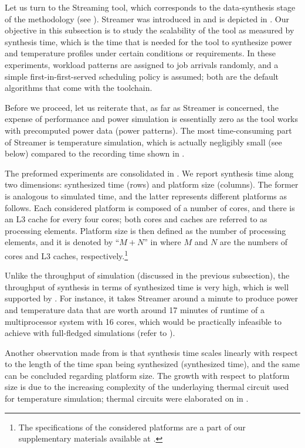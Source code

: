 
Let us turn to the Streaming tool, which corresponds to the data-synthesis stage
of the methodology (see ). Streamer was introduced in
 and is depicted in . Our objective in this
subsection is to study the scalability of the tool as measured by synthesis
time, which is the time that is needed for the tool to synthesize power and
temperature profiles under certain conditions or requirements. In these
experiments, workload patterns are assigned to job arrivals randomly, and a
simple first-in-first-served scheduling policy is assumed; both are the default
algorithms that come with the toolchain.

Before we proceed, let us reiterate that, as far as Streamer is concerned, the
expense of performance and power simulation is essentially zero as the tool
works with precomputed power data (power patterns). The most time-consuming part
of Streamer is temperature simulation, which is actually negligibly small (see
below) compared to the recording time shown in .

The preformed experiments are consolidated in . We report
synthesis time along two dimensions: synthesized time (rows) and platform size
(columns). The former is analogous to simulated time, and the latter represents
different platforms as follows. Each considered platform is composed of a number
of cores, and there is an L3 cache for every four cores; both cores and caches
are referred to as processing elements. Platform size is then defined as the
number of processing elements, and it is denoted by ``$M + N$'' in
 where $M$ and $N$ are the numbers of cores and L3 caches,
respectively.\footnote{The specifications of the considered platforms are a part
of our supplementary materials available at \cite{sources}.}

Unlike the throughput of simulation (discussed in the previous subsection), the
throughput of synthesis in terms of synthesized time is very high, which is well
supported by . For instance, it takes Streamer around a minute
to produce power and temperature data that are worth around 17 minutes of
runtime of a multiprocessor system with 16 cores, which would be practically
infeasible to achieve with full-fledged simulations (refer to ).

Another observation made from  is that synthesis time scales
linearly with respect to the length of the time span being synthesized
(synthesized time), and the same can be concluded regarding platform size. The
growth with respect to platform size is due to the increasing complexity of the
underlaying thermal  circuit used for temperature simulation; thermal
circuits were elaborated on in .
